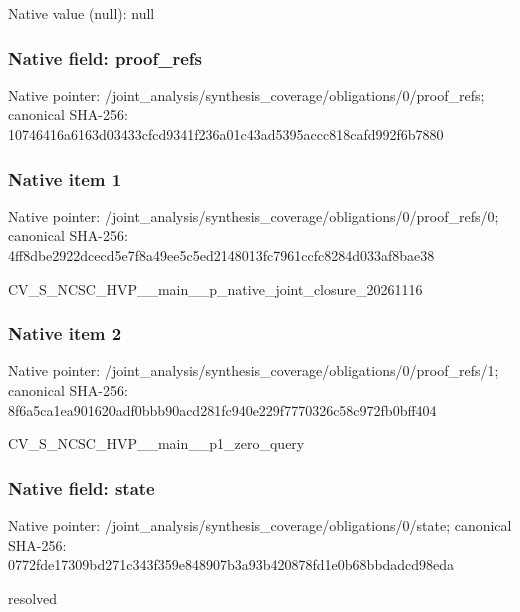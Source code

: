 \documentclass[10pt,a4paper]{article}
\begin{document}
Native value (null): null

\subsubsection{Native field: proof\_\allowbreak{}refs}
Native pointer: /joint\_\allowbreak{}analysis/synthesis\_\allowbreak{}coverage/obligations/0/proof\_\allowbreak{}refs; canonical SHA-256: 10746416a6163d03433cfcd9341f236a01c43ad5395accc818cafd992f6b7880

\subsubsection{Native item 1}
Native pointer: /joint\_\allowbreak{}analysis/synthesis\_\allowbreak{}coverage/obligations/0/proof\_\allowbreak{}refs/0; canonical SHA-256: 4ff8dbe2922dcecd5e7f8a49ee5c5ed2148013fc7961ccfc8284d033af8bae38

\begingroup\raggedright\sloppy CV\_\allowbreak{}S\_\allowbreak{}NCSC\_\allowbreak{}HVP\_\allowbreak{}\_\allowbreak{}main\_\allowbreak{}\_\allowbreak{}p\_\allowbreak{}native\_\allowbreak{}joint\_\allowbreak{}closure\_\allowbreak{}20261116\par\endgroup

\subsubsection{Native item 2}
Native pointer: /joint\_\allowbreak{}analysis/synthesis\_\allowbreak{}coverage/obligations/0/proof\_\allowbreak{}refs/1; canonical SHA-256: 8f6a5ca1ea901620adf0bbb90acd281fc940e229f7770326c58c972fb0bff404

\begingroup\raggedright\sloppy CV\_\allowbreak{}S\_\allowbreak{}NCSC\_\allowbreak{}HVP\_\allowbreak{}\_\allowbreak{}main\_\allowbreak{}\_\allowbreak{}p1\_\allowbreak{}zero\_\allowbreak{}query\par\endgroup

\subsubsection{Native field: state}
Native pointer: /joint\_\allowbreak{}analysis/synthesis\_\allowbreak{}coverage/obligations/0/state; canonical SHA-256: 0772fde17309bd271c343f359e848907b3a93b420878fd1e0b68bbdadcd98eda

\begingroup\raggedright\sloppy resolved\par\endgroup
\end{document}
